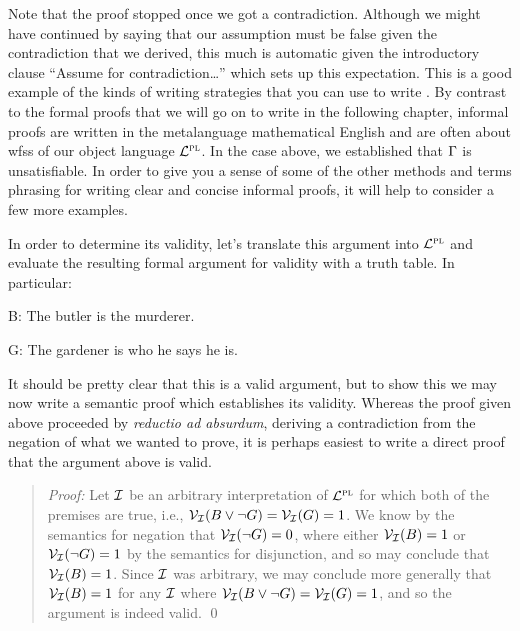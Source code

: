 Note that the proof stopped once we got a contradiction.
Although we might have continued by saying that our assumption must be false given the contradiction that we derived, this much is automatic given the introductory clause ``Assume for contradiction\ldots'' which sets up this expectation.
This is a good example of the kinds of writing strategies that you can use to write .
By contrast to the formal proofs that we will go on to write in the following chapter, informal proofs are written in the metalanguage mathematical English and are often about wfss of our object language $\mathcal{L}^{\textsc{pl}}$.
In the case above, we established that $\Gamma$ is unsatisfiable. 
In order to give you a sense of some of the other methods and terms phrasing for writing clear and concise informal proofs, it will help to consider a few more examples.


\begin{earg}
\end{earg}

In order to determine its validity, let's translate this argument into $\mathcal{L}^{\textsc{pl}}$ and evaluate the resulting formal argument for validity with a truth table.
In particular:

\begin{ekey}
  \item[B:] The butler is the murderer.
  \item[G:] The gardener is who he says he is.
\end{ekey}

\begin{earg}
\end{earg}

It should be pretty clear that this is a valid argument, but to show this we may now write a semantic proof which establishes its validity.
Whereas the proof given above proceeded by \textit{reductio ad absurdum}, deriving a contradiction from the negation of what we wanted to prove, it is perhaps easiest to write a direct proof that the argument above is valid.

\begin{quote} 
  \textit{Proof:}
  Let $\mathcal{I}$ be an arbitrary interpretation of $\mathcal{L}^{\textsc{pl}}$ for which both of the premises are true, i.e., $\mathcal{V}_{\mathcal{I}}(B \vee \neg G) = \mathcal{V}_{\mathcal{I}}(G) = 1$. 
  We know by the semantics for negation that $\mathcal{V}_{\mathcal{I}}(\neg G) = 0$, where either $\mathcal{V}_{\mathcal{I}}(B) = 1$ or $\mathcal{V}_{\mathcal{I}}(\neg G) = 1$ by the semantics for disjunction, and so may conclude that $\mathcal{V}_{\mathcal{I}}(B) = 1$.
  Since $\mathcal{I}$ was arbitrary, we may conclude more generally that $\mathcal{V}_{\mathcal{I}}(B) = 1$ for any $\mathcal{I}$ where $\mathcal{V}_{\mathcal{I}}(B \vee \neg G) = \mathcal{V}_{\mathcal{I}}(G) = 1$, and so the argument is indeed valid.
  \qed
\end{quote}

